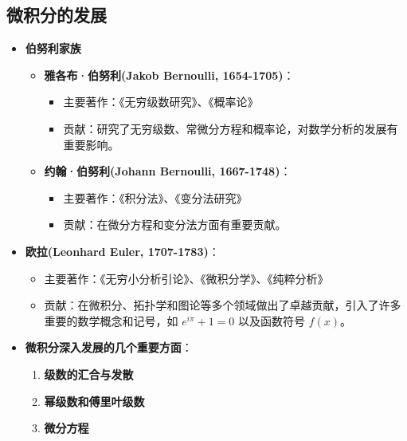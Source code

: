 \documentclass{Math_Note}
\begin{document}
\subsection{微积分的发展}
\begin{itemize}
    \item \textbf{伯努利家族}
    \begin{itemize}
        \item \textbf{雅各布·伯努利(Jakob Bernoulli, 1654-1705)}：
        \begin{itemize}
            \item 主要著作：《无穷级数研究》、《概率论》
            \item 贡献：研究了无穷级数、常微分方程和概率论，对数学分析的发展有重要影响。
        \end{itemize}
        \item \textbf{约翰·伯努利(Johann Bernoulli, 1667-1748)}：
        \begin{itemize}
            \item 主要著作：《积分法》、《变分法研究》
            \item 贡献：在微分方程和变分法方面有重要贡献。
        \end{itemize}
    \end{itemize}
    
    \item \textbf{欧拉(Leonhard Euler, 1707-1783)}：
    \begin{itemize}
        \item 主要著作：《无穷小分析引论》、《微积分学》、《纯粹分析》
        \item 贡献：在微积分、拓扑学和图论等多个领域做出了卓越贡献，引入了许多重要的数学概念和记号，如 $e^{i\pi} + 1 = 0$ 以及函数符号 $f(x)$。
    \end{itemize}

    \item \textbf{微积分深入发展的几个重要方面}：
    \begin{enumerate}
        \item \textbf{级数的汇合与发散}
        \item \textbf{幂级数和傅里叶级数}
        \item \textbf{微分方程}
    \end{enumerate}
\end{itemize}
\end{document}
